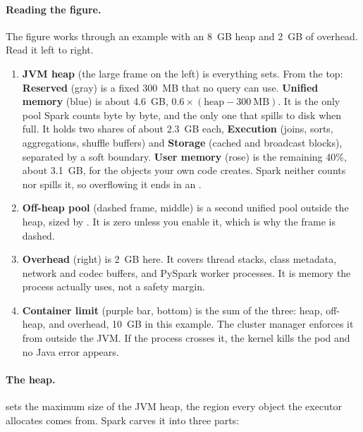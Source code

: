 \paragraph{Reading the figure.} The figure works through an example with an 8~GB heap and 2~GB of
overhead. Read it left to right.
\begin{enumerate}[nosep]
\item \textbf{JVM heap} (the large frame on the left) is everything
       sets. From the top: \textbf{Reserved} (gray) is a
      fixed 300~MB that no query can use. \textbf{Unified memory} (blue) is about
      4.6~GB, $0.6 \times (\text{heap} - 300~\text{MB})$. It is the only pool Spark
      counts byte by byte, and the only one that spills to disk when full. It holds
      two shares of about 2.3~GB each, \textbf{Execution} (joins, sorts,
      aggregations, shuffle buffers) and \textbf{Storage} (cached and broadcast
      blocks), separated by a soft boundary. \textbf{User memory} (rose) is the
      remaining 40\%, about 3.1~GB, for the objects your own code creates. Spark
      neither counts nor spills it, so overflowing it ends in an
      .
\item \textbf{Off-heap pool} (dashed frame, middle) is a second unified pool
      outside the heap, sized by . It is zero unless
      you enable it, which is why the frame is dashed.
\item \textbf{Overhead} (right) is 2~GB here. It covers thread stacks, class
      metadata, network and codec buffers, and PySpark worker processes. It is
      memory the process actually uses, not a safety margin.
\item \textbf{Container limit} (purple bar, bottom) is the sum of the three:
      heap, off-heap, and overhead, 10~GB in this example. The cluster manager
      enforces it from outside the JVM. If the process crosses it, the kernel kills
      the pod and no Java error appears.
\end{enumerate}

\paragraph{The heap.}  sets the maximum size of the
JVM heap, the region every object the executor allocates comes from. Spark carves
it into three parts:

